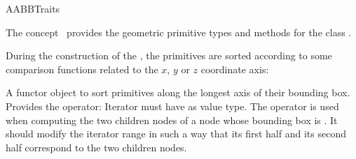 \ccRefPageBegin


\begin{ccRefConcept}{AABBTraits}


\ccDefinition
  
The concept \ccRefName\ provides the geometric primitive types and methods for the class .

\ccTypes









During the construction of the , the primitives are sorted according to some comparison functions related to the $x$, $y$ or $z$ coordinate axis:

{A functor object to sort primitives along the longest axis of their bounding box. Provides the operator:
 Iterator  must have  as value type. The operator is used when computing the two children nodes of a node whose bounding box is . It should modify the iterator range in such a way that its first half and its second half correspond to the two children nodes.}


\end{ccRefConcept}
